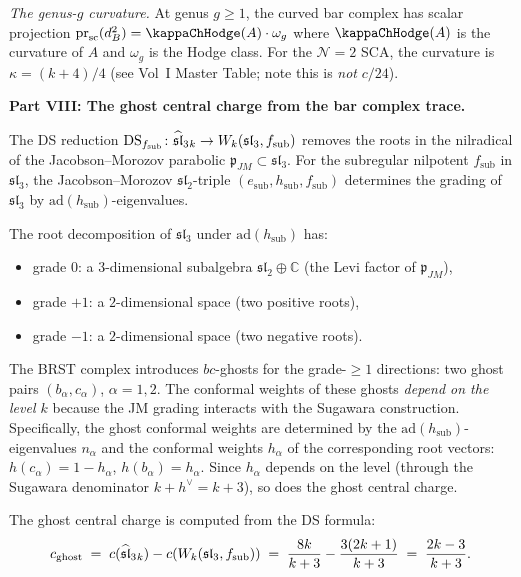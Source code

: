 \begin{computation}
\emph{The genus-$g$ curvature.}
At genus $g\ge 1$, the curved bar complex has scalar projection
$\operatorname{pr}_{\mathrm{sc}}(d_B^2) = \kappaChHodge(A)\cdot\omega_g$ where
$\kappaChHodge(A)$ is the curvature of $A$ and $\omega_g$ is the
Hodge class. For the $\mathcal N=2$ SCA, the curvature is
$\kappa = (k+4)/4$ (see Vol~I Master Table; note this is \emph{not} $c/24$).

\medskip
\noindent\textbf{Part VIII: The ghost central charge from the
bar complex trace.}

The DS reduction
$\mathrm{DS}_{f_{\mathrm{sub}}}\colon
\widehat{\mathfrak{sl}}_3{}_k \to W_k(\mathfrak{sl}_3,f_{\mathrm{sub}})$
removes the roots in the nilradical of the
Jacobson--Morozov parabolic $\mathfrak p_{JM}
\subset\mathfrak{sl}_3$. For the subregular nilpotent
$f_{\mathrm{sub}}$ in $\mathfrak{sl}_3$, the
Jacobson--Morozov $\mathfrak{sl}_2$-triple
$(e_{\mathrm{sub}}, h_{\mathrm{sub}}, f_{\mathrm{sub}})$
determines the grading of $\mathfrak{sl}_3$ by
$\mathrm{ad}(h_{\mathrm{sub}})$-eigenvalues.

The root decomposition of $\mathfrak{sl}_3$ under
$\mathrm{ad}(h_{\mathrm{sub}})$ has:
\begin{itemize}
\item grade $0$: a $3$-dimensional subalgebra
$\mathfrak{sl}_2\oplus\mathbb C$ (the Levi factor of
$\mathfrak p_{JM}$),
\item grade $+1$: a $2$-dimensional space (two positive roots),
\item grade $-1$: a $2$-dimensional space (two negative roots).
\end{itemize}
The BRST complex introduces $bc$-ghosts for the grade-$\ge 1$
directions: two ghost pairs $(b_\alpha, c_\alpha)$,
$\alpha=1,2$. The conformal weights of these ghosts
\emph{depend on the level $k$} because the JM grading
interacts with the Sugawara construction. Specifically,
the ghost conformal weights are determined by the
$\mathrm{ad}(h_{\mathrm{sub}})$-eigenvalues $n_\alpha$
and the conformal weights $h_\alpha$ of the
corresponding root vectors:
$h(c_\alpha) = 1 - h_\alpha$, $h(b_\alpha) = h_\alpha$.
Since $h_\alpha$ depends on the level (through the
Sugawara denominator $k+h^\vee = k+3$), so does the
ghost central charge.

The ghost central charge is computed from the DS formula:
\begin{equation}\label{eq:c-ghost-subregular}
c_{\mathrm{ghost}}
\;=\;
c(\widehat{\mathfrak{sl}}_3{}_k) - c(W_k(\mathfrak{sl}_3,f_{\mathrm{sub}}))
\;=\;
\frac{8k}{k+3} - \frac{3(2k+1)}{k+3}
\;=\;
\frac{2k-3}{k+3}.
\end{equation}


\end{computation}
